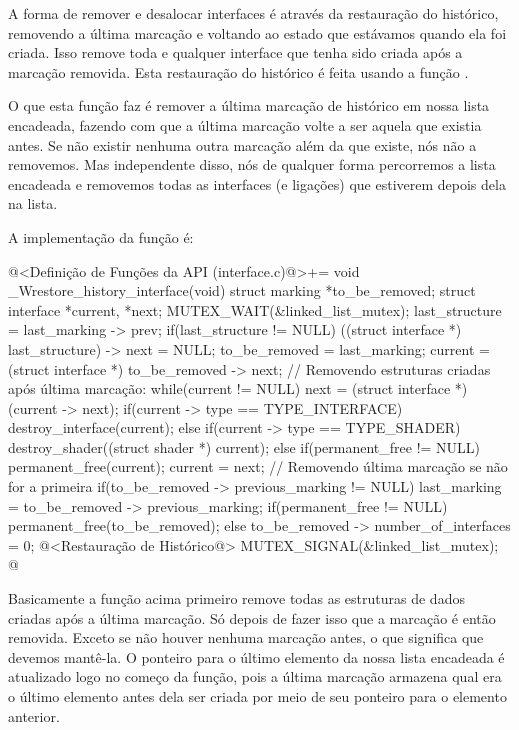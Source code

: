 
A forma de remover e desalocar interfaces é através da restauração do
histórico, removendo a última marcação e voltando ao estado que
estávamos quando ela foi criada. Isso remove toda e qualquer interface
que tenha sido criada após a marcação removida. Esta restauração do
histórico é feita usando a função
.

O que esta função faz é remover a última marcação de histórico em
nossa lista encadeada, fazendo com que a última marcação volte a ser
aquela que existia antes. Se não existir nenhuma outra marcação além
da que existe, nós não a removemos. Mas independente disso, nós de
qualquer forma percorremos a lista encadeada e removemos todas as
interfaces (e ligações) que estiverem depois dela na lista.

A implementação da função é:

\iniciocodigo
@<Definição de Funções da API (interface.c)@>+=
void _Wrestore_history_interface(void){
  struct marking *to_be_removed;
  struct interface *current, *next;
  MUTEX_WAIT(&linked_list_mutex);
  last_structure = last_marking -> prev;
  if(last_structure != NULL)
    ((struct interface *) last_structure) -> next = NULL;
  to_be_removed = last_marking;
  current = (struct interface *) to_be_removed -> next;
  // Removendo estruturas criadas após última marcação:
  while(current != NULL){
    next = (struct interface *) (current -> next);
    if(current -> type == TYPE_INTERFACE)
      destroy_interface(current);
    else if(current -> type == TYPE_SHADER)
      destroy_shader((struct shader *) current);
    else if(permanent_free != NULL)
      permanent_free(current);
    current = next;
  }
  // Removendo última marcação se não for a primeira
  if(to_be_removed -> previous_marking != NULL){
    last_marking = to_be_removed -> previous_marking;
    if(permanent_free != NULL)
      permanent_free(to_be_removed);
  }
  else
    to_be_removed -> number_of_interfaces = 0;
  @<Restauração de Histórico@>
  MUTEX_SIGNAL(&linked_list_mutex);
}
@
\fimcodigo

Basicamente a função acima primeiro remove todas as estruturas de
dados criadas após a última marcação. Só depois de fazer isso que a
marcação é então removida. Exceto se não houver nenhuma marcação
antes, o que significa que devemos mantê-la. O ponteiro para o último
elemento da nossa lista encadeada é atualizado logo no começo da
função, pois a última marcação armazena qual era o último elemento
antes dela ser criada por meio de seu ponteiro para o elemento
anterior.

